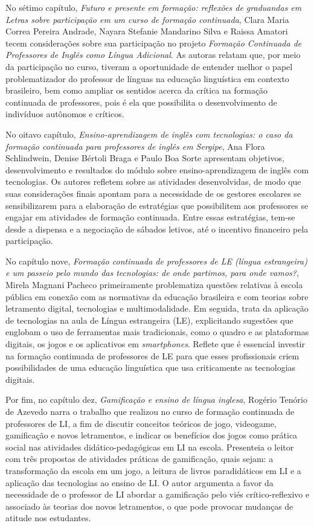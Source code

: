\documentclass[portuguese]{textolivre}
\begin{document}
No sétimo capítulo, \textit{Futuro e presente em formação: reflexões de graduandas em Letras sobre participação em um curso de formação continuada}, Clara Maria Correa Pereira Andrade, Nayara Stefanie Mandarino Silva e Raissa Amatori tecem considerações sobre sua participação no projeto \textit{Formação Continuada de Professores de Inglês como Língua Adicional}. As autoras relatam que, por meio da participação no curso, tiveram a oportunidade de entender melhor o papel problematizador do professor de línguas na educação linguística em contexto brasileiro, bem como ampliar os sentidos acerca da crítica na formação continuada de professores, pois é ela que possibilita o desenvolvimento de indivíduos autônomos e críticos.

No oitavo capítulo, \textit{Ensino-aprendizagem de inglês com tecnologias: o caso da formação continuada para professores de inglês em Sergipe}, Ana Flora Schlindwein, Denise Bértoli Braga e Paulo Boa Sorte apresentam objetivos, desenvolvimento e resultados do módulo sobre ensino-aprendizagem de inglês com tecnologias. Os autores refletem sobre as atividades desenvolvidas, de modo que suas considerações finais apontam para a necessidade de os gestores escolares se sensibilizarem para a elaboração de estratégias que possibilitem aos professores se engajar em atividades de formação continuada. Entre essas estratégias, tem-se desde a dispensa e a negociação de sábados letivos, até o incentivo financeiro pela participação.

No capítulo nove, \textit{Formação continuada de professores de LE (língua estrangeira) e um passeio pelo mundo das tecnologias: de onde partimos, para onde vamos?}, Mirela Magnani Pacheco primeiramente problematiza questões relativas à escola pública em conexão com as normativas da educação brasileira e com teorias sobre letramento digital, tecnologias e multimodalidade. Em seguida, trata da aplicação de tecnologias na aula de Língua estrangeira (LE), explicitando sugestões que englobam o uso de ferramentas mais tradicionais, como o quadro e as plataformas digitais, os jogos e os aplicativos em \textit{smartphones}. Reflete que é essencial investir na formação continuada de professores de LE para que esses profissionais criem possibilidades de uma educação linguística que usa criticamente as tecnologias digitais.

Por fim, no capítulo dez, \textit{Gamificação e ensino de língua inglesa}, Rogério Tenório de Azevedo narra o trabalho que realizou no curso de formação continuada de professores de LI, a fim de discutir conceitos teóricos de jogo, videogame, gamificação e novos letramentos, e indicar os benefícios dos jogos como prática social nas atividades didático-pedagógicas em LI na escola. Presenteia o leitor com três propostas de atividades práticas de gamificação, quais sejam: a transformação da escola em um jogo, a leitura de livros paradidáticos em LI e a aplicação das tecnologias ao ensino de LI. O autor argumenta a favor da necessidade de o professor de LI abordar a gamificação pelo viés crítico-reflexivo e associado às teorias dos novos letramentos, o que pode provocar mudanças de atitude nos estudantes.
\end{document}

